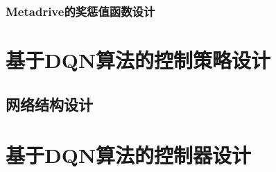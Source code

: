 \subsubsection{Metadrive的奖惩值函数设计}


\section{基于DQN算法的控制策略设计}



\subsection{网络结构设计}


\section{基于DQN算法的控制器设计}
